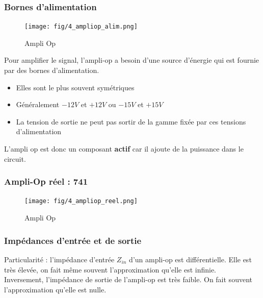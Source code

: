 \documentclass[a4paper]{article}
\begin{document}
        \subsubsection{Bornes d'alimentation}
            \begin{figure}[H]
                \begin{center}
                    \texttt{[image: fig/4\_ampliop\_alim.png]}
                    \caption{Ampli Op}
                \end{center}
            \end{figure}
            Pour amplifier le signal, l'ampli-op a besoin d'une source d'énergie qui est fournie par des bornes d'alimentation.\\
            \begin{itemize}
                \item Elles sont le plus souvent symétriques
                \item Généralement $-12V$ et $+12V$ ou $-15V$ et $+15V$
                \item La tension de sortie ne peut pas sortir de la gamme fixée par ces tensions d'alimentation
            \end{itemize}
            L'ampli op est donc un composant \textbf{actif} car il ajoute de la puissance dans le circuit.
        \subsubsection{Ampli-Op réel : 741}
            \begin{figure}[H]
                \begin{center}
                    \texttt{[image: fig/4\_ampliop\_reel.png]}
                    \caption{Ampli Op}
                \end{center}
            \end{figure}

    \subsubsection{Impédances d'entrée et de sortie}
    Particularité : l'impédance d'entrée $Z_{in}$ d'un ampli-op est différentielle.
    Elle est très élevée, on fait même souvent l'approximation qu'elle est infinie.\\

    Inversement, l'impédance de sortie de l'ampli-op est très faible. On fait
    souvent l'approximation qu'elle est nulle.\\
\end{document}
